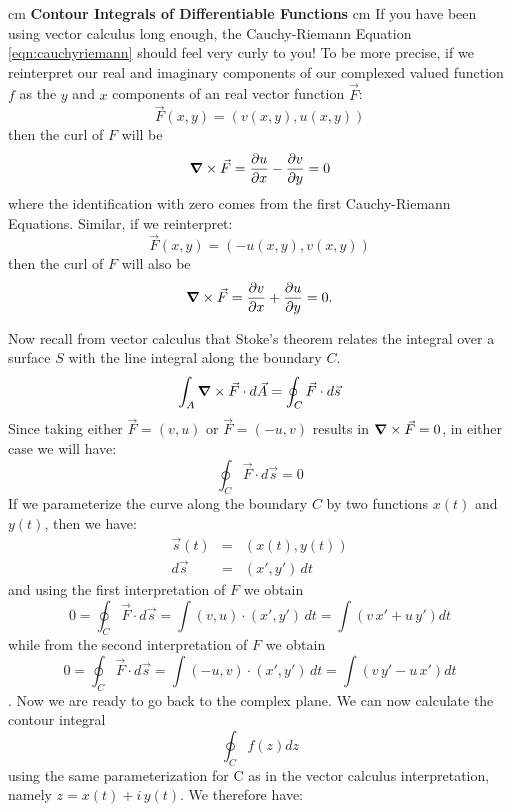 \documentclass[12pt]{article}
\begin{document}
 cm
\noindent
{\bf Contour Integrals of Differentiable Functions}
 cm
\noindent
If you have been using vector calculus long enough, the Cauchy-Riemann Equation
\eqref{eqn:cauchyriemann} should feel very curly to you!  To be more precise, if
we reinterpret our real and imaginary components of our complexed valued
function $f$ as the $y$ and $x$ components of an real vector function $\vec{F}$:
\begin{displaymath}
\vec{F}(x,y) = (v(x,y), u(x,y))
\end{displaymath}
then the curl of $F$ will be 
\begin{displaymath}
\mbox{\boldmath$ \nabla $} \times \vec{F} = \frac{\partial u}{\partial x} - \frac{\partial v}{\partial y} = 0
\end{displaymath}
where the identification with zero comes from the first Cauchy-Riemann Equations.
Similar, if we reinterpret:
\begin{displaymath}
\vec{F}(x,y) = (-u(x,y), v(x,y))
\end{displaymath}
then the curl of $F$ will also be 
\begin{displaymath}
\mbox{\boldmath$ \nabla $} \times \vec{F} = \frac{\partial v}{\partial x} + \frac{\partial u}{\partial y} = 0.
\end{displaymath}

Now recall from vector calculus that Stoke's theorem relates the integral over a surface $S$ with the line integral along the boundary $C$. 
\begin{equation}
\int_A \mbox{\boldmath$ \nabla $} \times \vec{F} \cdot d\vec{A}= \oint_C \vec{F} \cdot d\vec{s}
\end{equation}
Since taking either $\vec{F}=(v,u)$ or $\vec{F}=(-u,v)$ results in $\mbox{\boldmath$ \nabla $} \times \vec{F} = 0$, in either case we will have:
\begin{equation}
\oint_C \vec{F} \cdot d\vec{s} = 0
\end{equation}
If we parameterize the curve along the boundary $C$ by two functions $x(t)$ and $y(t)$, then we have:
\begin{eqnarray*}
\vec{s}(t) &=& \left(x(t),y(t)\right)\\
d\vec{s} &=& \left(x',y'\right)\,dt
\end{eqnarray*}
and using the first interpretation of $F$ we obtain
\begin{equation} \label{eqn:vecb}
0 = \oint_C \vec{F} \cdot d\vec{s} 
= \int (v,u) \cdot (x',y')\,dt
= \int (v\,x' + u\, y') dt
\end{equation}
while from the second interpretation of $F$ we obtain
\begin{equation} \label{eqn:vecb}
0 = \oint_C \vec{F} \cdot d\vec{s} 
= \int (-u,v) \cdot (x',y')\,dt
= \int (v\,y' - u\, x') dt
\end{equation}.
Now we are ready to go back to the complex plane.  We can now calculate the contour integral
\begin{displaymath}
\oint_C f(z) dz
\end{displaymath}
using the same parameterization for C as in the vector calculus interpretation, namely $z = x(t) + i\,y(t)$.  We therefore have:
\end{document}
